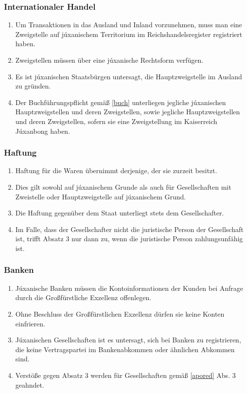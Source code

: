 \documentclass{article}
\begin{document}
\subsubsection{Internationaler Handel}
\begin{enumerate}[(1)]
    \item Um Transaktionen in das Ausland und Inland vorzunehmen, muss man eine Zweigstelle auf júxanischem Territorium im Reichshandelsregister registriert haben.
\item Zweigstellen müssen über eine júxanische Rechtsform verfügen.
\item Es ist júxanischen Staatsbürgen untersagt, die Hauptzweigstelle im Ausland zu gründen.
\item Der Buchführungspflicht gemäß \ref{buch} unterliegen jegliche júxanischen Hauptzweigstellen und deren Zweigstellen, sowie jegliche Hauptzweigstellen und deren Zweigstellen, sofern sie eine Zweigstellung im Kaiserreich Júxanbong haben.
\end{enumerate}

\subsubsection{Haftung}
\begin{enumerate}[(1)]
    \item Haftung für die Waren übernimmt derjenige, der sie zurzeit besitzt.
    \item Dies gilt sowohl auf júxanischem Grunde als auch für Gesellschaften mit Zweistelle oder Hauptzweigstelle auf júxanischem Grund.
    \item Die Haftung gegenüber dem Staat unterliegt stets dem Gesellschafter.
    \item Im Falle, dass der Gesellschafter nicht die juristische Person der Gesellschaft ist, trifft Absatz 3 nur dann zu, wenn die juristische Person zahlungsunfähig ist.
\end{enumerate}

\subsubsection{Banken}
\begin{enumerate}[(1)]
    \item Júxanische Banken müssen die Kontoinformationen der Kunden bei Anfrage durch die Großfürstliche Exzellenz offenlegen.
    \item Ohne Beschluss der Großfürstlichen Exzellenz dürfen sie keine Konten einfrieren.
    \item Júxanischen Gesellschaften ist es untersagt, sich bei Banken zu registrieren, die keine Vertragspartei im Bankenabkommen oder ähnlichen Abkommen sind.
    \item Verstöße gegen Absatz 3 werden für Gesellschaften gemäß \ref{apored} Abs. 3 geahndet.
\end{enumerate}
\end{document}
